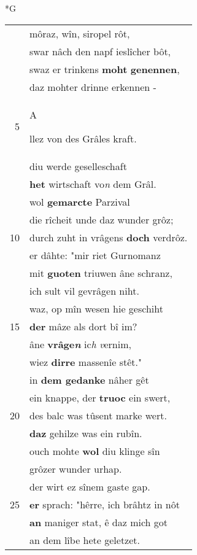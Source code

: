 \documentclass[8pt,a4paper,notitlepage]{article}
\begin{document}
\begin{table}[ht]
\begin{minipage}[t]{0.5\linewidth}
\small
\begin{center}*G
\end{center}
\begin{tabular}{rl}
 & môraz, wîn, siropel rôt,\\ 
 & swar nâch den napf ieslîcher bôt,\\ 
 & swaz er trinkens \textbf{moht} \textbf{genennen},\\ 
 & daz mohter drinne erkennen -\\ 
5 & \begin{large}A\end{large}llez von des Grâles kraft.\\ 
 & diu werde geselleschaft\\ 
 & \textbf{het} wirtschaft vo\textit{n} dem Grâl.\\ 
 & wol \textbf{gemarcte} Parzival\\ 
 & die rîcheit unde daz wunder grôz;\\ 
10 & durch zuht in vrâgens \textbf{doch} verdrôz.\\ 
 & er dâhte: "mir riet Gurnomanz\\ 
 & mit \textbf{guoten} triuwen âne schranz,\\ 
 & ich sult vil gevrâgen niht.\\ 
 & waz, op mîn wesen hie geschiht\\ 
15 & \textbf{der} mâze als dort bî im?\\ 
 & âne \textbf{vrâge\textit{n}} ic\textit{h} \textit{v}ernim,\\ 
 & wiez \textbf{dirre} massenîe stêt."\\ 
 & in \textbf{dem gedanke} nâher gêt\\ 
 & ein knappe, der \textbf{truoc} ein swert,\\ 
20 & des balc was tûsent marke wert.\\ 
 & \textbf{daz} gehilze was ein rubîn.\\ 
 & ouch mohte \textbf{wol} diu klinge sîn\\ 
 & grôzer wunder urhap.\\ 
 & der wirt ez sînem gaste gap.\\ 
25 & \textbf{er} sprach: "hêrre, ich brâhtz in nôt\\ 
 & \textbf{an} maniger stat, ê daz mich got\\ 
 & an dem lîbe hete geletzet.\\ 

\end{tabular}
\end{minipage}
\end{table}
\end{document}
